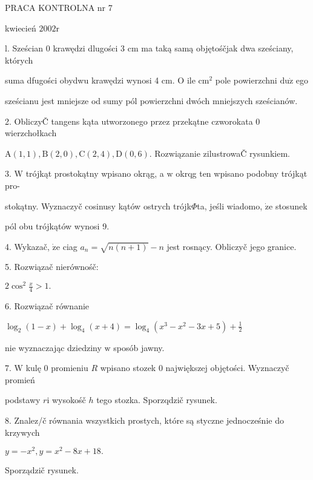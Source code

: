\documentclass[a4paper,12pt]{article}
\begin{document}
PRACA KONTROLNA nr 7

kwiecień $2002\mathrm{r}$

l. Sześcian $0$ krawędzi dlugości 3 cm ma taką samą objętośčjak dwa sześciany, których

suma dfugości obydwu krawędzi wynosi 4 cm. $\mathrm{O}$ ile $\mathrm{c}\mathrm{m}^{2}$ pole powierzchni $\mathrm{d}\mathrm{u}\dot{\mathrm{z}}$ ego

sześcianu jest mniejsze od sumy pól powierzchni dwóch mniejszych sześcianów.

2. ObliczyČ tangens kąta utworzonego przez przekątne czworokata $0$ wierzchołkach

$\mathrm{A}(1,1), \mathrm{B}(2,0), \mathrm{C}(2,4), \mathrm{D}(0,6)$. Rozwiązanie zilustrowaČ rysunkiem.

3. $\mathrm{W}$ trójkąt prostokątny wpisano okrąg, a $\mathrm{w}$ okrqg ten wpisano podobny trójkąt pro-

stokątny. Wyznaczyč cosinusy kątów ostrych trójk$\Phi$ta, jeśli wiadomo, $\dot{\mathrm{z}}\mathrm{e}$ stosunek

pól obu trójkątów wynosi 9.

4. Wykazač, $\dot{\mathrm{z}}\mathrm{e}$ ciag $a_{n}=\sqrt{n(n+1)}-n$ jest rosnący. Obliczyč jego granice.

5. Rozwiązač nierównośč:

$2\displaystyle \cos^{2}\frac{x}{4}>1.$

6. Rozwiązač równanie

$\displaystyle \log_{2}(1-x)+\log_{4}(x+4)=\log_{4}(x^{3}-x^{2}-3x+5)+\frac{1}{2}$

nie wyznaczając dziedziny $\mathrm{w}$ sposób jawny.

7. $\mathrm{W}$ kulę $0$ promieniu $R$ wpisano stozek $0$ największej objętości. Wyznaczyč promień

podstawy $r\mathrm{i}$ wysokośč $h$ tego stozka. Sporzqdzič rysunek.

8. Znalez/č równania wszystkich prostych, które są styczne jednocześnie do krzywych

$y=-x^{2},y=x^{2}-8x+18.$

Sporządzič rysunek.
\end{document}
